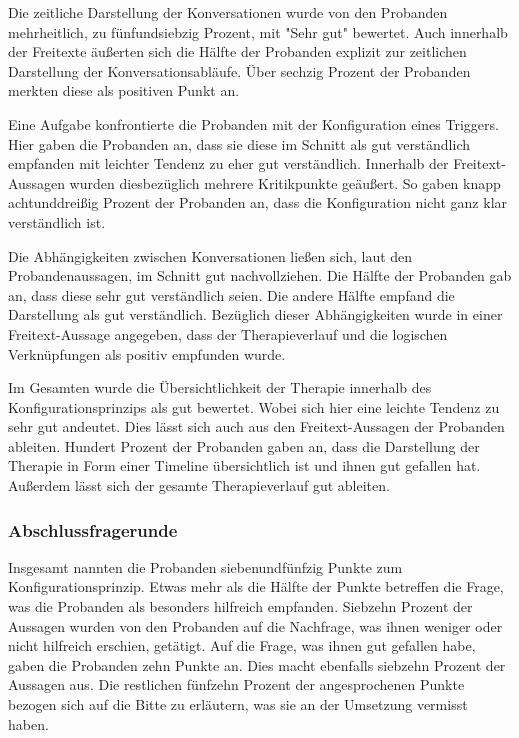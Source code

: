 Die zeitliche Darstellung der Konversationen wurde von den Probanden mehrheitlich, zu fünfundsiebzig Prozent, mit "Sehr gut" bewertet. Auch innerhalb der Freitexte äußerten sich die Hälfte der Probanden explizit zur zeitlichen Darstellung der Konversationsabläufe. Über sechzig Prozent der Probanden merkten diese als positiven Punkt an.

Eine Aufgabe konfrontierte die Probanden mit der Konfiguration eines Triggers. Hier gaben die Probanden an, dass sie diese im Schnitt als gut verständlich empfanden mit leichter Tendenz zu eher gut verständlich. Innerhalb der Freitext-Aussagen wurden diesbezüglich mehrere Kritikpunkte geäußert. So gaben knapp achtunddreißig Prozent der Probanden an, dass die Konfiguration nicht ganz klar verständlich ist.

Die Abhängigkeiten zwischen Konversationen ließen sich, laut den Probandenaussagen, im Schnitt gut nachvollziehen. Die Hälfte der Probanden gab an, dass diese sehr gut verständlich seien. Die andere Hälfte empfand die Darstellung als gut verständlich. Bezüglich dieser Abhängigkeiten wurde in einer Freitext-Aussage angegeben, dass der Therapieverlauf und die logischen Verknüpfungen als positiv empfunden wurde. 

Im Gesamten wurde die Übersichtlichkeit der Therapie innerhalb des Konfigurationsprinzips als gut bewertet. Wobei sich hier eine leichte Tendenz zu sehr gut andeutet. Dies lässt sich auch aus den Freitext-Aussagen der Probanden ableiten. Hundert Prozent der Probanden gaben an, dass die Darstellung der Therapie in Form einer Timeline übersichtlich ist und ihnen gut gefallen hat. Außerdem lässt sich der gesamte Therapieverlauf gut ableiten.

\subsubsection{Abschlussfragerunde}
Insgesamt nannten die Probanden siebenundfünfzig Punkte zum Konfigurationsprinzip. Etwas mehr als die Hälfte der Punkte betreffen die Frage, was die Probanden als besonders hilfreich empfanden. Siebzehn Prozent der Aussagen wurden von den Probanden auf die Nachfrage, was ihnen weniger oder nicht hilfreich erschien, getätigt. Auf die Frage, was ihnen gut gefallen habe, gaben die Probanden zehn Punkte an. Dies macht ebenfalls siebzehn Prozent der Aussagen aus. Die restlichen fünfzehn Prozent der angesprochenen Punkte bezogen sich auf die Bitte zu erläutern, was sie an der Umsetzung vermisst haben. 

